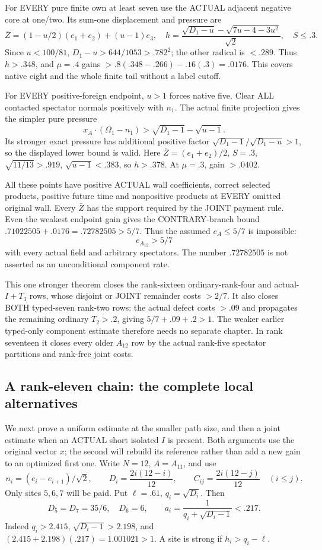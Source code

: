 \documentclass[11pt]{article}
\begin{document}
For EVERY pure finite own at least seven use
the ACTUAL adjacent negative core at one/two.
Its sum-one displacement and pressure are
\[
 \bar Z=(1-u/2)(e_1+e_2)+(u-1)e_3,\quad
 h={\frac{\sqrt{D_1-u}-\sqrt{7u-4-3u^2}}{\sqrt2}},
 \quad S\le.3 .
\]
Since \(u<100/81\),
\(D_1-u>644/1053>.782^2\);
the other radical is \(<.289\).
Thus \(h>.348\), and \(\mu=.4\) gains
\(>.8(.348-.266)-.16(.3)=.0176\).
This covers native eight and the whole finite
tail without a label cutoff.

For EVERY positive-foreign endpoint, \(u>1\)
forces native five.
Clear ALL contacted spectator normals positively
with \(n_1\).
The actual finite projection gives the simpler
pure pressure
\[
 x_A\cdot(\Omega_1-n_1)>
                  \sqrt{D_1-1}-\sqrt{u-1}.
\]
Its stronger exact pressure has additional
positive factor
\(\sqrt{D_1-1}/\sqrt{D_1-u}>1\), so the
displayed lower bound is valid.
Here \(\bar Z=(e_1+e_2)/2\), \(S=.3\),
\(\sqrt{11/13}>.919\), \(\sqrt{u-1}<.383\),
so \(h>.378\).
At \(\mu=.3\), gain \(>.0402\).

All these points have positive ACTUAL wall
coefficients, correct selected products, positive
future time and nonpositive products at EVERY
omitted original wall.
Every \(\bar Z\) has the support required
by the JOINT payment rule.
Even the weakest endpoint gain gives the
CONTRARY-branch bound
\(.71022505+.0176=.72782505>5/7\).
Thus the assumed \(e_A\le5/7\) is impossible:
\[
                                  e_{A_{12}}>5/7
\tag{A12U}\label{eq:arithA12universal}
\]
with every actual field and arbitrary spectators.
The number \(.72782505\) is not asserted
as an unconditional component rate.

This one stronger theorem closes the rank-sixteen
ordinary-rank-four and actual-\(I+T_3\) rows,
whose disjoint or JOINT remainder costs \(>2/7\).
It also closes BOTH typed-seven rank-two rows:
the actual defect costs \(>.09\) and propagates
the remaining ordinary \(T_2>.2\), giving
\(5/7+.09+.2>1\).
The weaker earlier typed-only component estimate
therefore needs no separate chapter.
In rank seventeen it closes every older
\(A_{12}\) row by the actual rank-five spectator
partitions and rank-free joint costs.

\subsection{A rank-eleven chain: the complete local alternatives}
\label{app:arithA11local}

We next prove a uniform estimate at the smaller
path size, and then a joint estimate when an
ACTUAL short isolated \(I\) is present.
Both arguments use the original vector \(x\);
the second will rebuild its reference rather
than add a new gain to an optimized first one.
Write \(N=12\), \(A=A_{11}\), and use
\[
 n_i=(e_i-e_{i+1})/\sqrt2,\qquad
 D_i={\frac{2i(12-i)}{12}},\qquad
 C_{ij}={\frac{2i(12-j)}{12}}\quad(i\le j).
\]
Only sites \(5,6,7\) will be paid.
Put \(\ell=.61\), \(q_i=\sqrt{D_i}\).
Then
\[
 D_5=D_7=35/6,\quad D_6=6,\qquad
 a_i={\frac{1}{q_i+\sqrt{D_i-1}}}<.217.
\tag{A11a}\label{eq:arithA11a}
\]
Indeed \(q_i>2.415\),
\(\sqrt{D_i-1}>2.198\), and
\((2.415+2.198)(.217)=1.001021>1\).
A site is strong if \(h_i>q_i-\ell\).
\end{document}
